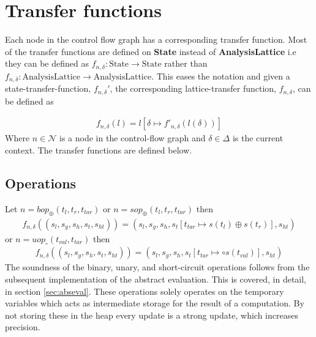 \section{Transfer functions}
\label{sec:transferf}
\newcommand{\letin}[1]{\texttt{let } #1 \texttt{in }}
\newcommand{\ifelse}[3]{\texttt{if }#1\texttt{ then } #2 \texttt{ else } #3}
\newcommand{\match}[1]{\texttt{match }#1}
\newcommand{\with}[1]{\texttt{with }#1\text{: }}
\newcommand{\coerce}[2]{c_{\text{#1}, \text{#2}}}
\newcommand{\default}{\texttt{default: }}
Each node in the control flow graph has a corresponding transfer function. Most of the transfer functions are defined on {\bf State} instead of {\bf AnalysisLattice} i.e they can be defined as $f_{n,\delta} : \text{State} \rightarrow \text{State}$ rather than $f_{n,\delta} : \text{AnalysisLattice} \rightarrow \text{AnalysisLattice}$. This eases the notation and given a state-transfer-function, $f_{n,\delta}'$, the corresponding lattice-transfer function, $f_{n,\delta}$, can be defined as

\begin{align}
f_{n,\delta}(l) = l[\delta\mapsto f'_{n, \delta}(l(\delta))]
\end{align}
Where $n\in\mathcal{N}$ is a node in the control-flow graph and $\delta\in \Delta$ is the current context. The transfer functions are defined below.

\subsection{Operations}
Let $n = \mathit{bop}_\oplus(t_l,t_r,t_{tar})$ or $n =  \mathit{sop}_\oplus(t_l,t_r,t_{tar})$ then 
\begin{align}
f_{n,\delta}((s_l, s_g, s_h, s_t, s_{ht})) = (s_l, s_g, s_h, s_t[t_{tar}\mapsto s(t_l)\oplus s(t_r)], s_{ht})
\end{align}
or $n = uop_\circ(t_{val},t_{tar})$ then
\begin{align}
f_{n,\delta}((s_l, s_g, s_h, s_t, s_{ht})) = (s_l, s_g, s_h, s_t[t_{tar}\mapsto \circ s(t_{val})], s_{ht})
\end{align}
The soundness of the binary, unary, and short-circuit operations follows from the subsequent implementation of the abstract evaluation. This is covered, in detail, in section \ref{sec:abseval}. These operations solely operates on the temporary variables which acts as intermediate storage for the result of a computation.  By not storing these in the heap every update is a strong update, which increases precision.

